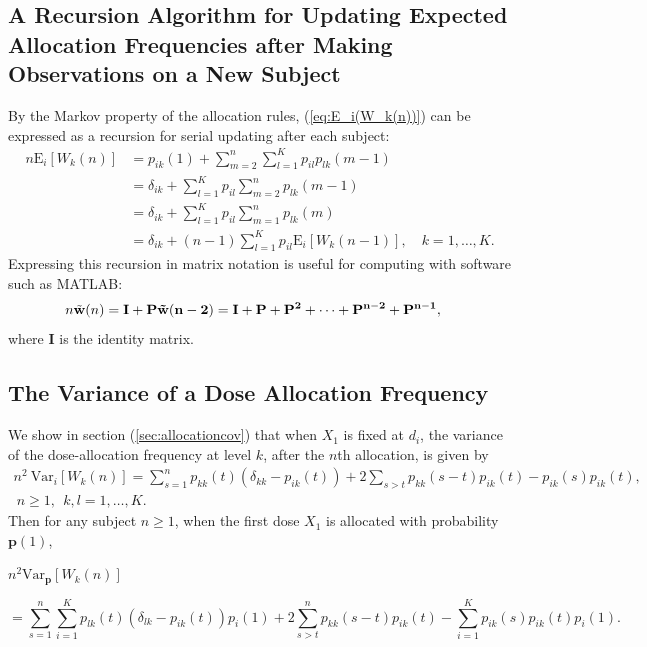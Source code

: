 \subsection{A Recursion Algorithm for Updating Expected Allocation Frequencies after Making Observations on a New Subject}
By the Markov property of the allocation rules,
(\ref{eq:E_i(W_k(n))}) can be expressed as a recursion for serial
updating after each subject:
\begin{align*}
n\mathrm{E}_i\left[W_k(n)\right]&=p_{ik}(1)+\sum_{m=2}^n\sum_{l=1}^Kp_{il}p_{lk}(m-1)\\
&=\delta_{ik}+\sum_{l=1}^Kp_{il}\sum_{m=2}^np_{lk}(m-1)\\
&=\delta_{ik}+\sum_{l=1}^Kp_{il}\sum_{m=1}^np_{lk}(m)\\
&=\delta_{ik}+(n-1)\sum_{l=1}^Kp_{il}\mathrm{E}_i\left[W_{k}(n-1)\right],
\quad k=1,\ldots,K.
\end{align*}
Expressing this recursion in matrix notation is useful for
computing with software such as MATLAB:
\begin{align*}
n\tilde{\mathbf{w}}(n)&=\bf{I}+\mathbf{P}\tilde{\mathbf{w}}(n-2)
=\bf{I}+\mathbf{P}+\mathbf{P}^2+\cdots
+\mathbf{P}^{n-2}+\mathbf{P}^{n-1},
\end{align*}
where $\mathbf{I}$ is the identity matrix.

\subsection{The Variance of a Dose Allocation Frequency}\label{sec:allocationvariances}
We show in section (\ref{sec:allocationcov}) that  when $X_1$ is
fixed at $d_i$, the variance of the dose-allocation frequency at level $k$, after the $n$th allocation,   is given by
\begin{align*}
n^2\ \textrm{Var}_i\left[W_k(n)\right]
=\sum_{s=1}^np_{kk}(t)\left(\delta_{kk}-p_{ik}(t)\right)
+
2\sum_{s>t} p_{kk}(s-t)p_{ik}(t)-p_{ik}(s)p_{ik}(t),\\
%
\ n\ge 1,\ \ k,l=1,\ldots,K.
\end{align*}
Then for any subject $n\ge 1$, when the first dose $X_1$ is allocated with
probability $\mathbf{p}(1)$,
\begin{flushleft}
$n^2\textrm{Var}_{\mathbf{p}}\left[W_k(n)\right]$
\end{flushleft}
\begin{equation*}
=\sum_{s=1}^n \displaystyle\sum_{i=1}^Kp_{lk}(t)\left(\delta_{lk}-p_{ik}(t)\right)p_i(1)
+2\sum_{s>t}^n p_{kk}(s-t)p_{ik}(t)-\displaystyle\sum_{i=1}^Kp_{ik}(s)p_{ik}(t)p_i(1).
\end{equation*}

